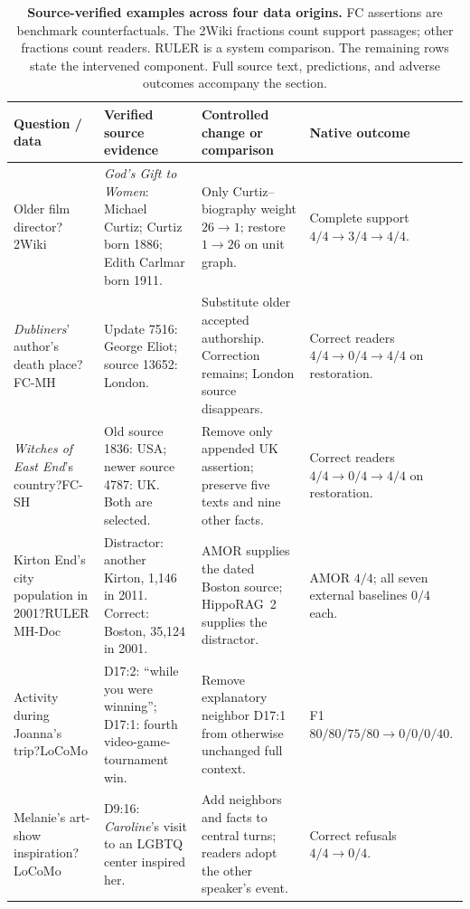 \begin{table}[t]
\centering
\small
\setlength{\tabcolsep}{4pt}
\begin{tabular}{p{}p{}p{}p{}}
\toprule
Question / data & Verified source evidence & Controlled change or comparison & Native outcome \\
\midrule
Older film director?\newline 2Wiki & \emph{God's Gift to Women}: Michael Curtiz; Curtiz born 1886; Edith Carlmar born 1911. & Only Curtiz--biography weight $26\to1$; restore $1\to26$ on unit graph. & Complete support $4/4\to3/4\to4/4$. \\
\addlinespace[2pt]
\emph{Dubliners}' author's death place?\newline FC-MH & Update 7516: George Eliot; source 13652: London. & Substitute older accepted authorship. Correction remains; London source disappears. & Correct readers $4/4\to0/4\to4/4$ on restoration. \\
\addlinespace[2pt]
\emph{Witches of East End}'s country?\newline FC-SH & Old source 1836: USA; newer source 4787: UK. Both are selected. & Remove only appended UK assertion; preserve five texts and nine other facts. & Correct readers $4/4\to0/4\to4/4$ on restoration. \\
\addlinespace[2pt]
Kirton End's city population in 2001?\newline RULER MH-Doc & Distractor: another Kirton, 1,146 in 2011. Correct: Boston, 35,124 in 2001. & AMOR supplies the dated Boston source; HippoRAG~2 supplies the distractor. & AMOR $4/4$; all seven external baselines $0/4$ each. \\
\addlinespace[2pt]
Activity during Joanna's trip?\newline LoCoMo & D17:2: ``while you were winning''; D17:1: fourth video-game-tournament win. & Remove explanatory neighbor D17:1 from otherwise unchanged full context. & F1 $80/80/75/80\to0/0/0/40$. \\
\addlinespace[2pt]
Melanie's art-show inspiration?\newline LoCoMo & D9:16: \emph{Caroline}'s visit to an LGBTQ center inspired her. & Add neighbors and facts to central turns; readers adopt the other speaker's event. & Correct refusals $4/4\to0/4$. \\
\bottomrule
\end{tabular}
\caption{\textbf{Source-verified examples across four data origins.} FC assertions are benchmark counterfactuals. The 2Wiki fractions count support passages; other fractions count readers. RULER is a system comparison. The remaining rows state the intervened component. Full source text, predictions, and adverse outcomes accompany the section.}
\label{tab:memory-examples}
\end{table}

